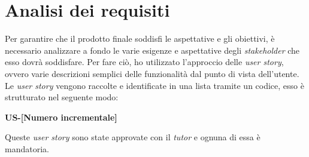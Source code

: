 \section{Analisi dei requisiti}\label{sec:analysis}\noindent
Per garantire che il prodotto finale soddisfi le aspettative e gli obiettivi, è necessario analizzare a fondo le varie esigenze e aspettative degli \textit{stakeholder} che esso dovrà soddisfare.
Per fare ciò, ho utilizzato l'approccio delle \textit{user story}, ovvero varie descrizioni semplici delle funzionalità dal punto di vista dell'utente.\\
Le \textit{user story} vengono raccolte e identificate in una lista tramite un codice, esso è strutturato nel seguente modo:
\begin{center}
    \textbf{US-[Numero incrementale]}
\end{center}\noindent
Queste \textit{user story} sono state approvate con il \textit{tutor} e ognuna di essa è mandatoria.
